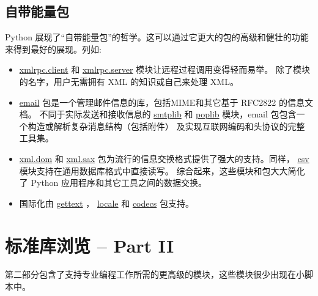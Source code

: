 \documentclass[a4paper,10pt,english]{sphinxmanual}
\begin{document}
\section{自带能量包}
\label{stdlib:tut-batteries-included}\label{stdlib:id12}
Python 展现了“自带能量包”的哲学。这可以通过它更大的包的高级和健壮的功能来得到最好的展现。列如:
\begin{itemize}
\item {} 
\href{https://docs.python.org/3/library/xmlrpc.client.html\#module-xmlrpc.client}{xmlrpc.client} 和 \href{https://docs.python.org/3/library/xmlrpc.server.html\#module-xmlrpc.server}{xmlrpc.server} 模块让远程过程调用变得轻而易举。
除了模块的名字，用户无需拥有 XML 的知识或自己来处理 XML。

\item {} 
\href{https://docs.python.org/3/library/email.html\#module-email}{email} 包是一个管理邮件信息的库，包括MIME和其它基于 RFC2822 的信息文档。
不同于实际发送和接收信息的 \href{https://docs.python.org/3/library/smtplib.html\#module-smtplib}{smtplib} 和 \href{https://docs.python.org/3/library/poplib.html\#module-poplib}{poplib} 模块，email 包包含一个构造或解析复杂消息结构（包括附件）
及实现互联网编码和头协议的完整工具集。

\item {} 
\href{https://docs.python.org/3/library/xml.dom.html\#module-xml.dom}{xml.dom} 和 \href{https://docs.python.org/3/library/xml.sax.html\#module-xml.sax}{xml.sax} 包为流行的信息交换格式提供了强大的支持。同样， \href{https://docs.python.org/3/library/csv.html\#module-csv}{csv}  模块支持在通用数据库格式中直接读写。
综合起来，这些模块和包大大简化了 Python 应用程序和其它工具之间的数据交换。

\item {} 
国际化由 \href{https://docs.python.org/3/library/gettext.html\#module-gettext}{gettext} ， \href{https://docs.python.org/3/library/locale.html\#module-locale}{locale} 和 \href{https://docs.python.org/3/library/codecs.html\#module-codecs}{codecs} 包支持。

\end{itemize}


\chapter{标准库浏览 -- Part II}
\label{stdlib2:tut-brieftourtwo}\label{stdlib2:statistics}\label{stdlib2:part-ii}\label{stdlib2::doc}
第二部分包含了支持专业编程工作所需的更高级的模块，这些模块很少出现在小脚本中。
\end{document}
